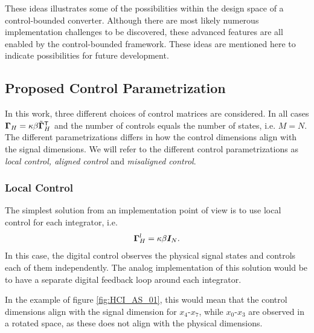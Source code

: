 These ideas illustrates some of the possibilities within the design space of a control-bounded converter. Although there are most likely numerous implementation challenges to be discovered, these advanced features are all enabled by the control-bounded framework. These ideas are mentioned here to indicate possibilities for future development.







\subsection{Proposed Control Parametrization}
In this work, three different choices of control matrices are considered. In all cases $\bm{\Gamma}_{H} = \kappa \beta \tilde{\bm{\Gamma}}^\mathsf{T}_{H}$ and the number of controls equals the number of states, i.e. $M=N$. The different parametrizations differs in how the control dimensions align with the signal dimensions. We will refer to the different control parametrizations as \textit{local control, aligned control} and \textit{misaligned control}.

\subsubsection*{Local Control}
The simplest solution from an implementation point of view is to use local control for each integrator, i.e.
\begin{equation}
    \bm{\Gamma}_{H}^l = \kappa\beta \bm{I}_{N}.
\end{equation}
In this case, the digital control observes the physical signal states and controls each of them independently. The analog implementation of this solution would be to have a separate digital feedback loop around each integrator.

In the example of figure \ref{fig:HCI_AS_01}, this would mean that the control dimensions align with the signal dimension for $x_4$-$x_7$, while $x_0$-$x_3$ are observed in a rotated space, as these does not align with the physical dimensions.

